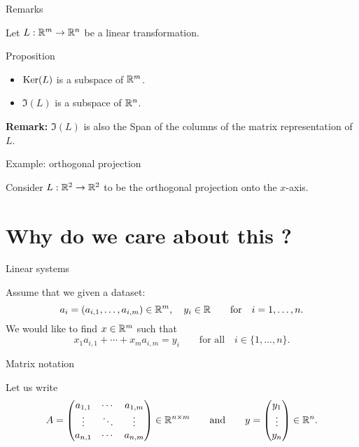 \documentclass{beamer}
\begin{document}
\begin{frame}[t]{Remarks}
	\grid

	Let \quad $L: \mathbb{R}^m \to \mathbb{R}^n$ \quad be a linear transformation.
	\begin{block}{Proposition}
		\begin{itemize}
			\item ${{\rm Ker}}(L)$ is a subspace of $\mathbb{R}^m$.
			\item $\Im(L)$ is a subspace of $\mathbb{R}^n$.
		\end{itemize}
	\end{block}
	\textbf{Remark:} $\Im(L)$ is also the Span of the columns of the matrix representation of $L$.

\end{frame}

\begin{frame}[t]{Example: orthogonal projection}
	\grid

	Consider \quad $L: \mathbb{R}^2 \to \mathbb{R}^2$ \quad to be the orthogonal projection onto the $x$-axis.
\end{frame}


\section{Why do we care about this ?}

\begin{frame}[t]{Linear systems}
	\grid

	Assume that we given a dataset:
	$$
	a_i = (a_{i,1}, \dots, a_{i,m}) \in \mathbb{R}^m, \quad y_i \in \mathbb{R} \qquad \text{for} \quad i = 1, \dots, n.
	$$
	We would like to find $x \in \mathbb{R}^m$ such that
	$$
	x_1 a_{i,1} + \cdots + x_m a_{i,m} = y_i \qquad \text{for all} \quad i \in \{1, \dots, n\}.
	$$
\end{frame}

\begin{frame}[t]{Matrix notation}
	\grid

	Let us write
	$$
	A = 
	\begin{pmatrix}
		a_{1,1}  & \cdots & a_{1,m} \\
		\vdots & \ddots & \vdots \\
		a_{n,1} & \cdots & a_{n,m} \\
	\end{pmatrix} \in \mathbb{R}^{n \times m}
	\qquad \text{and} \qquad
	y = 
	\begin{pmatrix}
		y_1 \\
		\vdots \\
		y_n
	\end{pmatrix}
	\in \mathbb{R}^n.
	$$
\end{frame}
\end{document}
